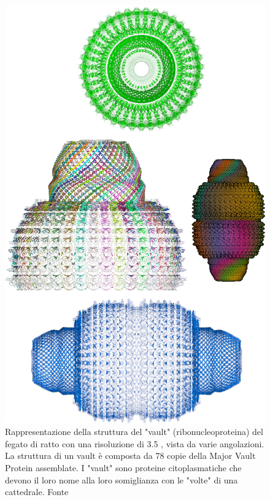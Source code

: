 
\begin{figure}[!htb]
	\centering
	\includegraphics[scale=1.55]{images/4v60_2.png}
	\caption{Rappresentazione della struttura del "vault" (ribonucleoproteina) del fegato di ratto con una risoluzione di 3.5 \angstrom, vista da varie angolazioni. La struttura di un vault è composta da 78 copie della Major Vault Protein assemblate. I "vault" sono proteine citoplasmatiche che devono il loro nome alla loro somiglianza con le "volte" di una cattedrale. Fonte\cite{4v60}}
	\label{fig:vault}
\end{figure}


\clearpage